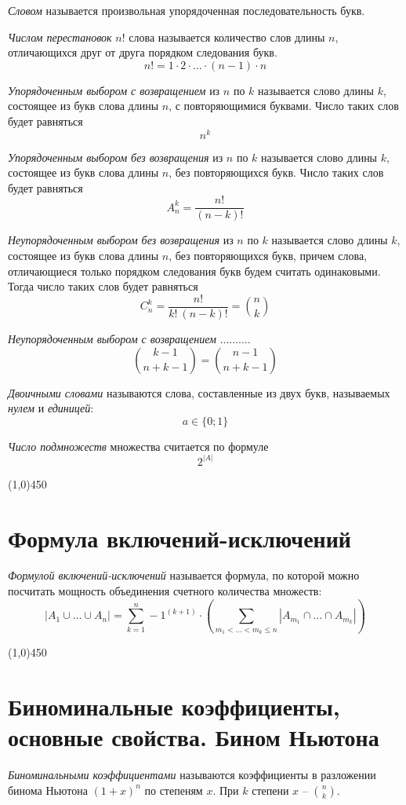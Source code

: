 \documentclass[a4paper,12pt]{article}
\begin{document}
	\textit{Словом} называется произвольная упорядоченная последовательность букв.
	
	\textit{Числом перестановок} $n!$ слова называется количество слов длины $n$, отличающихся друг от друга порядком следования букв.
	\[
	n! = 1 \cdot 2 \cdot \ldots \cdot (n - 1) \cdot n
	\]
	
	\textit{Упорядоченным выбором с возвращением} из $n$ по $k$ называется слово длины $k$, состоящее из букв слова длины $n$, с повторяющимися буквами. Число таких слов будет равняться 
	\[
	n^k
	\]
	
	\textit{Упорядоченным выбором без возвращения} из $n$ по $k$ называется слово длины $k$, состоящее из букв слова длины $n$, без повторяющихся букв. Число таких слов будет равняться
	\[
	A_n^k = \frac{n!}{(n - k)!}
	\]
	
	\textit{Неупорядоченным выбором без возвращения} из $n$ по $k$ называется слово длины $k$, состоящее из букв слова длины $n$, без повторяющихся букв, причем слова, отличающиеся только порядком следования букв будем считать одинаковыми. Тогда число таких слов будет равняться 
	\[
	C_n^k = \frac{n!}{k! \ (n - k)!} = {n \choose k}
	\]
	
	\textit{Неупорядоченным выбором с возвращением} ..........
	\[
	{k - 1 \choose n + k - 1} = {n - 1 \choose n + k - 1}
	\]
	
	\textit{Двоичными словами} называются слова, составленные из двух букв, называемых \textit{нулем} и \textit{единицей}:
	\[
	a \in \{0; 1\}
	\]
	

	\textit{Число подмножеств} множества считается по формуле 
	\[
	2 ^ {|A|}
	\]
	
	\begin{center}
		\line(1,0){450}
	\end{center}

	\section*{Формула включений-исключений}
	\textit{Формулой включений-исключений} называется формула, по которой можно посчитать мощность объединения счетного количества множеств:
	\[
	|A_1 \cup \ldots \cup A_n| = \sum_{k = 1}^{n} -1^{(k + 1)} \cdot (\sum_{m_1 < \ldots <m_k \leq n} |A_{m_1} \cap \ldots \cap A_{m_k}|)
	\]
	
	\begin{center}
		\line(1,0){450}
	\end{center}
	
	\section*{Биноминальные коэффициенты, основные свойства. Бином Ньютона}
	\textit{Биноминальными коэффициентами} называются коэффициенты в разложении бинома Ньютона $(1 + x)^n$ по степеням $x$. При $k$ степени $x$ -- ${n \choose k}$.
	
\end{document}

